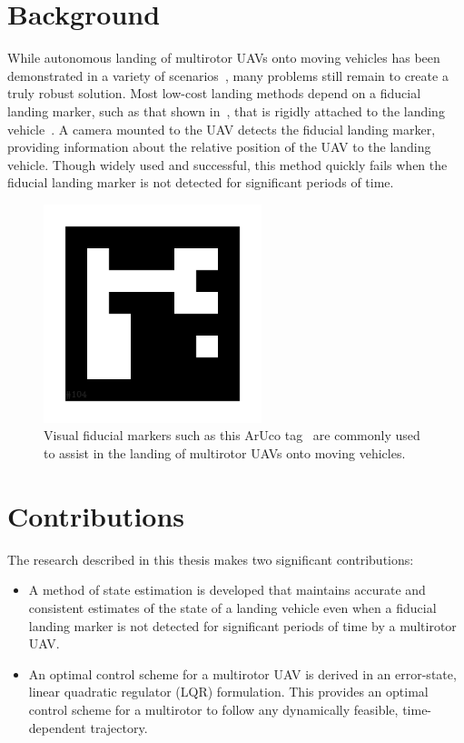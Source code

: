 \section{Background}

While autonomous landing of multirotor UAVs onto moving vehicles has been
demonstrated in a variety of scenarios~\cite{BLAH}, many problems still remain to
create a truly robust solution. Most low-cost landing methods depend on a fiducial
landing marker, such as that shown in~, that is rigidly attached to the landing vehicle~\cite{BLAH}.
A camera mounted to the UAV detects the fiducial landing marker, providing
information about the relative position of the UAV to the landing vehicle.
Though widely used and successful, this method quickly fails when the fiducial
landing marker is not detected for significant periods of time.

\begin{figure}[t]
  \centering
  \includegraphics[width=2.5in]{figures/aruco_104.png}
  \caption[Visual Fiducial Landing Marker]{Visual fiducial markers such as this
    ArUco tag~\cite{garrido2016generation} are commonly used to assist in the
  landing of multirotor UAVs onto moving vehicles.}
  \label{fig:aruco_tag}
\end{figure}

\section{Contributions}
The research described in this thesis makes two significant contributions:
\begin{itemize}
\item A method of state estimation is developed that maintains accurate and
  consistent estimates of the state of a landing vehicle even when a fiducial landing
  marker is not detected for significant periods of time by a multirotor UAV.
\item An optimal control scheme for a multirotor UAV is derived in an error-state, linear
  quadratic regulator (LQR) formulation. This provides an optimal control scheme
  for a multirotor to follow any dynamically feasible, time-dependent
  trajectory.
\end{itemize}

